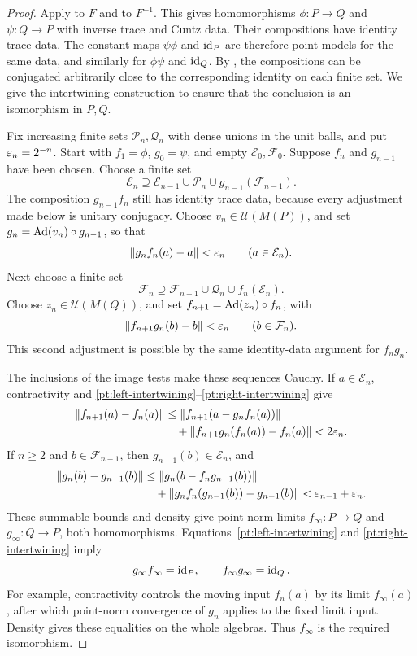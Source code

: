 \begin{proof}
Apply  to \(F\) and to \(F^{-1}\).
This gives homomorphisms
\(\phi:P\to Q\) and \(\psi:Q\to P\) with inverse
trace and Cuntz data.
Their compositions have identity trace data.  The
constant maps \(\psi\phi\) and \(\operatorname{id}_P\) are therefore
point models for the same data, and similarly for
\(\phi\psi\) and \(\operatorname{id}_Q\).
By , the compositions can be
conjugated arbitrarily close to the corresponding
identity on each finite set.
We give the intertwining construction to ensure that
the conclusion is an isomorphism in \(P,Q\).

Fix increasing finite sets \(\mathcal P_n,\mathcal Q_n\)
with dense unions in the unit balls, and put
\(\varepsilon_n=2^{-n}\).
Start with \(f_1=\phi\), \(g_0=\psi\), and empty
\(\mathcal E_0,\mathcal F_0\).
Suppose \(f_n\) and \(g_{n-1}\) have been chosen.
Choose a finite set
\[
 \mathcal E_n\supseteq
 \mathcal E_{n-1}\cup\mathcal P_n
       \cup g_{n-1}(\mathcal F_{n-1}).
\]
The composition \(g_{n-1}f_n\) still has identity
trace data, because every adjustment made below is
unitary conjugacy.
Choose \(v_n\in\mathcal U(M(P))\), and set
\(g_n=\operatorname{Ad}(v_n)\circ g_{n-1}\), so that
\begin{equation}\label{pt:left-intertwining}
 \|g_nf_n(a)-a\|<\varepsilon_n
 \qquad(a\in\mathcal E_n).
\end{equation}
Next choose a finite set
\[
 \mathcal F_n\supseteq
 \mathcal F_{n-1}\cup\mathcal Q_n\cup f_n(\mathcal E_n).
\]
Choose \(z_n\in\mathcal U(M(Q))\), and set
\(f_{n+1}=\operatorname{Ad}(z_n)\circ f_n\), with
\begin{equation}\label{pt:right-intertwining}
 \|f_{n+1}g_n(b)-b\|<\varepsilon_n
 \qquad(b\in\mathcal F_n).
\end{equation}
This second adjustment is possible by the same
identity-data argument for \(f_ng_n\).

The inclusions of the image tests make these sequences
Cauchy.  If \(a\in\mathcal E_n\), contractivity and
\eqref{pt:left-intertwining}--\eqref{pt:right-intertwining}
give
\begin{align*}
 \|f_{n+1}(a)-f_n(a)\|
 &\leq\|f_{n+1}(a-g_nf_n(a))\|\\
 &\quad+\|f_{n+1}g_n(f_n(a))-f_n(a)\|
 <2\varepsilon_n.
\end{align*}
If \(n\geq2\) and \(b\in\mathcal F_{n-1}\), then
\(g_{n-1}(b)\in\mathcal E_n\), and
\begin{align*}
 \|g_n(b)-g_{n-1}(b)\|
 &\leq\|g_n(b-f_ng_{n-1}(b))\|\\
 &\quad+\|g_nf_n(g_{n-1}(b))-g_{n-1}(b)\|
 <\varepsilon_{n-1}+\varepsilon_n.
\end{align*}
These summable bounds and density give point-norm
limits \(f_\infty:P\to Q\) and
\(g_\infty:Q\to P\), both homomorphisms.
Equations~\eqref{pt:left-intertwining} and
\eqref{pt:right-intertwining} imply
\[
 g_\infty f_\infty=\operatorname{id}_P,\qquad
 f_\infty g_\infty=\operatorname{id}_Q.
\]
For example, contractivity controls the moving input
\(f_n(a)\) by its limit \(f_\infty(a)\), after which
point-norm convergence of \(g_n\) applies to the fixed
limit input.  Density gives these equalities on the
whole algebras. Thus \(f_\infty\) is the required isomorphism.


\end{proof}
